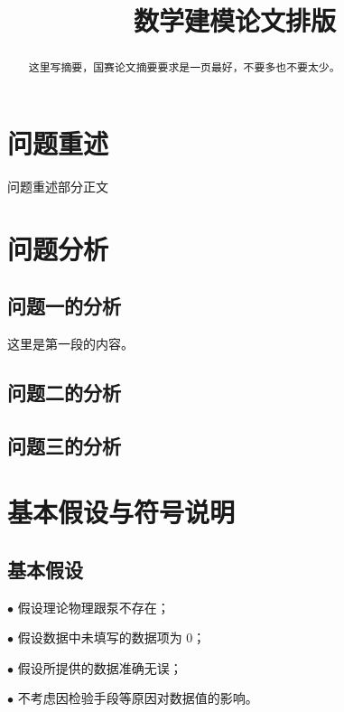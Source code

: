 \documentclass[withoutpreface,bwprint]{cumcmthesis} %
\title{数学建模论文排版}
\begin{document}
\maketitle
\begin{abstract}
	
	这里写摘要，国赛论文摘要要求是一页最好，不要多也不要太少。
	
\end{abstract}
 
 
 
\section{问题重述}

 
问题重述部分正文
\section{问题分析}
\subsection{问题一的分析}
这里是第一段的内容。
 
 
\subsection{问题二的分析}
 
\subsection{问题三的分析}
 
\section{基本假设与符号说明}
\subsection{基本假设}
$\bullet$ 假设理论物理跟泵不存在；
 
$\bullet$ 假设数据中未填写的数据项为 0；
 
$\bullet$ 假设所提供的数据准确无误；
 
$\bullet$ 不考虑因检验手段等原因对数据值的影响。
 
\end{document}
